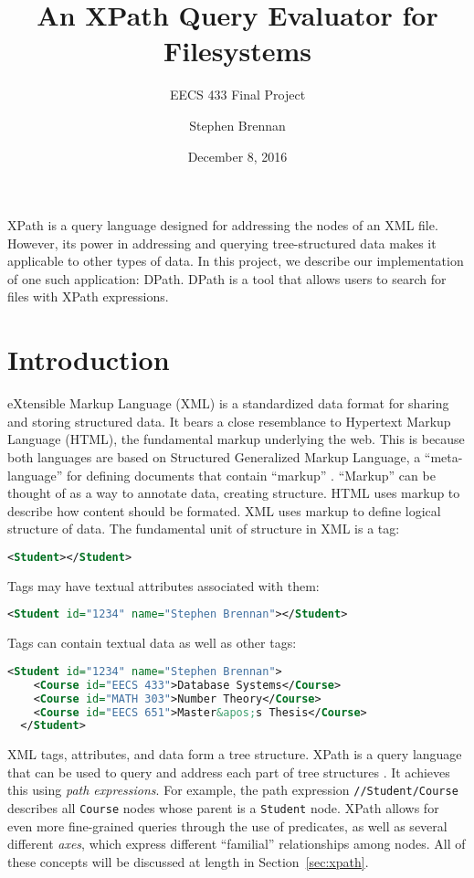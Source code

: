 \documentclass{scrartcl}
\title{An XPath Query Evaluator for Filesystems}
\subtitle{EECS 433 Final Project}
\date{December 8, 2016}
\author{Stephen Brennan}
\begin{document}
\maketitle

\abstract

XPath is a query language designed for addressing the nodes of an XML file.
However, its power in addressing and querying tree-structured data makes it
applicable to other types of data. In this project, we describe our
implementation of one such application: DPath. DPath is a tool that allows users
to search for files with XPath expressions.

\section{Introduction}

eXtensible Markup Language (XML) is a standardized data format for sharing and
storing structured data. It bears a close resemblance to Hypertext Markup
Language (HTML), the fundamental markup underlying the web. This is because both
languages are based on Structured Generalized Markup Language, a
``meta-language'' for defining documents that contain ``markup'' \cite{sgml}.
``Markup'' can be thought of as a way to annotate data, creating structure. HTML
uses markup to describe how content should be formated. XML uses markup to
define logical structure of data. The fundamental unit of structure in XML is a
tag:

\begin{lstlisting}[language=XML]
  <Student></Student>
\end{lstlisting}

Tags may have textual attributes associated with them:

\begin{lstlisting}[language=XML]
  <Student id="1234" name="Stephen Brennan"></Student>
\end{lstlisting}

Tags can contain textual data as well as other tags:

\begin{lstlisting}[language=XML]
  <Student id="1234" name="Stephen Brennan">
    <Course id="EECS 433">Database Systems</Course>
    <Course id="MATH 303">Number Theory</Course>
    <Course id="EECS 651">Master&apos;s Thesis</Course>
  </Student>
\end{lstlisting}

XML tags, attributes, and data form a tree structure. XPath is a query language
that can be used to query and address each part of tree structures \cite{xpath}.
It achieves this using \emph{path expressions}. For example, the path expression
\texttt{//Student/Course} describes all \texttt{Course} nodes whose parent is a
\texttt{Student} node. XPath allows for even more fine-grained queries through
the use of predicates, as well as several different \emph{axes}, which express
different ``familial'' relationships among nodes. All of these concepts will be
discussed at length in Section~\ref{sec:xpath}.
\end{document}

